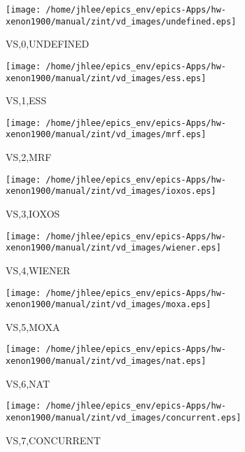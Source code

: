 \begin{figure}
  \centering
  \texttt{[image: /home/jhlee/epics\_env/epics-Apps/hw-xenon1900/manual/zint/vd\_images/undefined.eps]}
  \caption{VS,0,UNDEFINED}
\end{figure}
\begin{figure}
  \centering
  \texttt{[image: /home/jhlee/epics\_env/epics-Apps/hw-xenon1900/manual/zint/vd\_images/ess.eps]}
  \caption{VS,1,ESS}
\end{figure}
\begin{figure}
  \centering
  \texttt{[image: /home/jhlee/epics\_env/epics-Apps/hw-xenon1900/manual/zint/vd\_images/mrf.eps]}
  \caption{VS,2,MRF}
\end{figure}
\begin{figure}
  \centering
  \texttt{[image: /home/jhlee/epics\_env/epics-Apps/hw-xenon1900/manual/zint/vd\_images/ioxos.eps]}
  \caption{VS,3,IOXOS}
\end{figure}
\begin{figure}
  \centering
  \texttt{[image: /home/jhlee/epics\_env/epics-Apps/hw-xenon1900/manual/zint/vd\_images/wiener.eps]}
  \caption{VS,4,WIENER}
\end{figure}
\begin{figure}
  \centering
  \texttt{[image: /home/jhlee/epics\_env/epics-Apps/hw-xenon1900/manual/zint/vd\_images/moxa.eps]}
  \caption{VS,5,MOXA}
\end{figure}
\begin{figure}
  \centering
  \texttt{[image: /home/jhlee/epics\_env/epics-Apps/hw-xenon1900/manual/zint/vd\_images/nat.eps]}
  \caption{VS,6,NAT}
\end{figure}
\begin{figure}
  \centering
  \texttt{[image: /home/jhlee/epics\_env/epics-Apps/hw-xenon1900/manual/zint/vd\_images/concurrent.eps]}
  \caption{VS,7,CONCURRENT}
\end{figure}
